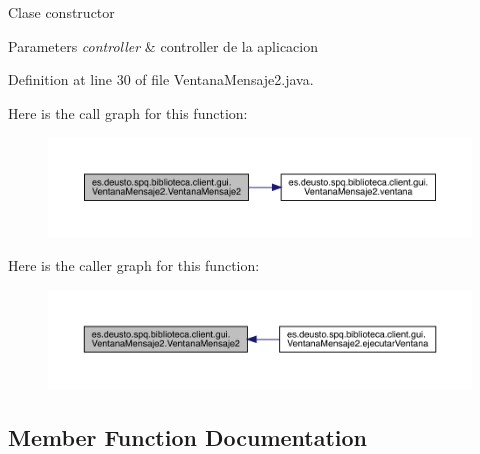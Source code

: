 Clase constructor 
\begin{DoxyParams}{Parameters}
{\em controller} & controller de la aplicacion \\
\hline
\end{DoxyParams}


Definition at line 30 of file Ventana\+Mensaje2.\+java.

Here is the call graph for this function\+:
\nopagebreak
\begin{figure}[H]
\begin{center}
\leavevmode
\includegraphics[width=350pt]{classes_1_1deusto_1_1spq_1_1biblioteca_1_1client_1_1gui_1_1_ventana_mensaje2_a0b7e5a8cdef3b609d95df34761ee5d89_cgraph}
\end{center}
\end{figure}
Here is the caller graph for this function\+:
\nopagebreak
\begin{figure}[H]
\begin{center}
\leavevmode
\includegraphics[width=350pt]{classes_1_1deusto_1_1spq_1_1biblioteca_1_1client_1_1gui_1_1_ventana_mensaje2_a0b7e5a8cdef3b609d95df34761ee5d89_icgraph}
\end{center}
\end{figure}


\subsection{Member Function Documentation}
\mbox{\label{classes_1_1deusto_1_1spq_1_1biblioteca_1_1client_1_1gui_1_1_ventana_mensaje2_a5cfb6fe1ffdd87b816f2fb653f5a172a}} 
